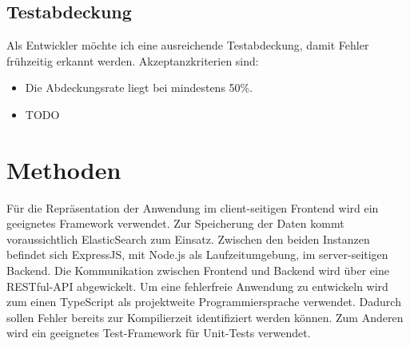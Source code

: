 \documentclass[a4paper, 10pt, conference]{ieeeconf}
\begin{document}
\subsection{Testabdeckung}

Als Entwickler möchte ich eine ausreichende Testabdeckung,  damit Fehler frühzeitig erkannt werden.  Akzeptanzkriterien sind:
\begin{itemize}
\item Die Abdeckungsrate liegt bei mindestens 50\%.
\item TODO
\end{itemize}

\section{Methoden} \label{s:methoden}
Für die Repräsentation der Anwendung im client-seitigen Frontend wird ein geeignetes Framework verwendet.  Zur Speicherung der Daten kommt voraussichtlich ElasticSearch zum Einsatz. Zwischen den beiden Instanzen befindet sich ExpressJS, mit Node.js als Laufzeitumgebung, im server-seitigen Backend.  Die Kommunikation zwischen Frontend und Backend wird über eine RESTful-API abgewickelt. Um eine fehlerfreie Anwendung zu entwickeln wird zum einen TypeScript als projektweite Programmiersprache verwendet.  Dadurch sollen Fehler bereits zur Kompilierzeit identifiziert werden können.  Zum Anderen wird ein geeignetes Test-Framework für Unit-Tests verwendet. 

\printbibliography
\end{document}

